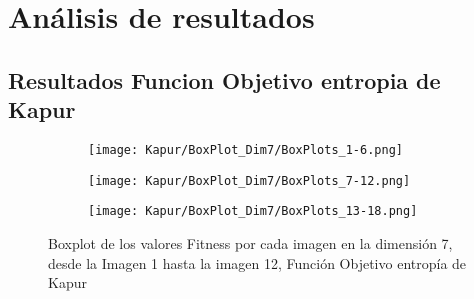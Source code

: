 \documentclass[conference]{IEEEtran}
\begin{document}


\section{Análisis de resultados} \label{sec:ce}
\subsection{Resultados Funcion Objetivo entropia de Kapur}
\begin{figure}
    \centering

    \begin{subfigure}{0.5\textwidth}
        \texttt{[image: Kapur/BoxPlot\_Dim7/BoxPlots\_1-6.png]}
    \end{subfigure}
    
    \begin{subfigure}{0.5\textwidth}
        \texttt{[image: Kapur/BoxPlot\_Dim7/BoxPlots\_7-12.png]}
    \end{subfigure}
         \begin{subfigure}{0.5\textwidth}
        \texttt{[image: Kapur/BoxPlot\_Dim7/BoxPlots\_13-18.png]}
    \end{subfigure}
    \caption{Boxplot de los valores Fitness por cada imagen en la dimensión 7, desde la Imagen 1 hasta la imagen 12, Función Objetivo entropía de Kapur}
\label{fig:imagenes}    
\end{figure}
\end{document}
